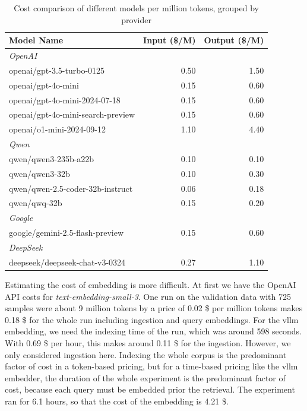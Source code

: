 \begin{table}[!ht]
    \centering
    \caption{Cost comparison of different models per million tokens, grouped by provider}
    \label{tab:model_costs}
    \begin{tabular}{lrr}
        \hline
        \textbf{Model Name} & \textbf{Input (\$/M)} & \textbf{Output (\$/M)} \\
        \hline
        \multicolumn{3}{l}{\textit{OpenAI}} \\
        openai/gpt-3.5-turbo-0125 & 0.50 & 1.50 \\
        openai/gpt-4o-mini & 0.15 & 0.60 \\
        openai/gpt-4o-mini-2024-07-18 & 0.15 & 0.60 \\
        openai/gpt-4o-mini-search-preview & 0.15 & 0.60 \\
        openai/o1-mini-2024-09-12 & 1.10 & 4.40 \\
        \hline
        \multicolumn{3}{l}{\textit{Qwen}} \\
        qwen/qwen3-235b-a22b & 0.10 & 0.10 \\
        qwen/qwen3-32b & 0.10 & 0.30 \\
        qwen/qwen-2.5-coder-32b-instruct & 0.06 & 0.18 \\
        qwen/qwq-32b & 0.15 & 0.20 \\
        \hline
        \multicolumn{3}{l}{\textit{Google}} \\
        google/gemini-2.5-flash-preview & 0.15 & 0.60 \\
        \hline
        \multicolumn{3}{l}{\textit{DeepSeek}} \\
        deepseek/deepseek-chat-v3-0324 & 0.27 & 1.10 \\
        \hline
    \end{tabular}
\end{table}

Estimating the cost of embedding is more difficult. At first we have the OpenAI API costs for \textit{text-embedding-small-3}. One run on the validation data with 725 samples were about 9 million tokens by a price of 0.02 \$ per million tokens makes 0.18 \$ for the whole run including ingestion and query embeddings. For the vllm embedding, we need the indexing time of the run, which was around 598 seconds. With 0.69 \$ per hour, this makes around 0.11 \$ for the ingestion. However, we only considered ingestion here. Indexing the whole corpus is the predominant factor of cost in a token-based pricing, but for a time-based pricing like the vllm embedder, the duration of the whole experiment is the predominant factor of cost, because each query must be embedded prior the retrieval. The experiment ran for 6.1 hours, so that the cost of the embedding is 4.21 \$. 




